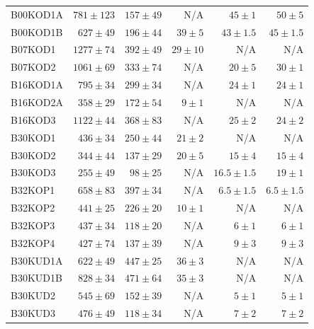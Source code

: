 \begin{table}
\begin{center}
\begin{tabular}[htbp]{lrrrrr}
\midrule
\cellcolor[gray]{0.9}B00KOD1A	& \cellcolor[gray]{0.9}$781\pm123$	& \cellcolor[gray]{0.9}$157\pm49$	& \cellcolor[gray]{0.9}N/A		& \cellcolor[gray]{0.9}$45\pm1$	& \cellcolor[gray]{0.9}$50\pm5$	\\
B00KOD1B	& $627\pm49$	& $196\pm44$	& $39\pm5$ 	& $43\pm1.5$	& $45\pm1.5$	\\
B07KOD1		& $1277\pm74$	& $392\pm49$	& $29\pm10$	& N/A		& N/A		\\
\cellcolor[gray]{0.9}B07KOD2		& \cellcolor[gray]{0.9}$1061\pm69$	& \cellcolor[gray]{0.9}$333\pm74$	& \cellcolor[gray]{0.9}N/A		& \cellcolor[gray]{0.9}$20\pm5$ 	& \cellcolor[gray]{0.9}$30\pm1$ 	\\
\cellcolor[gray]{0.9}B16KOD1A	& \cellcolor[gray]{0.9}$795\pm34$	& \cellcolor[gray]{0.9}$299\pm34$	& \cellcolor[gray]{0.9}N/A		& \cellcolor[gray]{0.9}$24\pm1$ 	& \cellcolor[gray]{0.9}$24\pm1$ 	\\
B16KOD2A	& $358\pm29$	& $172\pm54$	& $9\pm1$ 	& N/A		& N/A		\\
B16KOD3		& $1122\pm44$	& $368\pm83$	& N/A		& $25\pm2$ 	& $24\pm2$ 	\\
B30KOD1	 	& $436\pm34$	& $250\pm44$	& $21\pm2$ 	& N/A		& N/A		\\
B30KOD2		& $344\pm44$	& $137\pm29$	& $20\pm5$ 	& $15\pm4$	& $15\pm4$	\\
\cellcolor[gray]{0.9}B30KOD3 	& \cellcolor[gray]{0.9}$255\pm49$	& \cellcolor[gray]{0.9}$98\pm25$ 	& \cellcolor[gray]{0.9}N/A		& \cellcolor[gray]{0.9}$16.5\pm1.5$	& \cellcolor[gray]{0.9}$19\pm1$	\\
\cellcolor[gray]{0.9}B32KOP1 	& \cellcolor[gray]{0.9}$658\pm83$	& \cellcolor[gray]{0.9}$397\pm34$	& \cellcolor[gray]{0.9}N/A		& \cellcolor[gray]{0.9}$6.5\pm1.5$	& \cellcolor[gray]{0.9}$6.5\pm1.5$	\\
B32KOP2		& $441\pm25$	& $226\pm20$	& $10\pm1$ 	& N/A		& N/A		\\
B32KOP3		& $437\pm34$	& $118\pm20$	& N/A		& $6\pm1$ 	& $6\pm1$ 	\\
B32KOP4 	& $427\pm74$	& $137\pm39$	& N/A		& $9\pm3$ 	& $9\pm3$ 	\\
B30KUD1A	& $622\pm49$	& $447\pm25$	& $36\pm3$ 	& N/A		& N/A		\\
B30KUD1B	& $828\pm34$	& $471\pm64$	& $35\pm3$ 	& N/A		& N/A		\\
B30KUD2 	& $545\pm69$	& $152\pm39$	& N/A		& $5 \pm1$ 	& $5 \pm1$ 	\\
\cellcolor[gray]{0.9}B30KUD3 	& \cellcolor[gray]{0.9}$476\pm49$	& \cellcolor[gray]{0.9}$118\pm34$	& \cellcolor[gray]{0.9}N/A		& \cellcolor[gray]{0.9}$7\pm2$ 	& \cellcolor[gray]{0.9}$7\pm2$ 	\\

\end{tabular}
\end{center}
\end{table}
